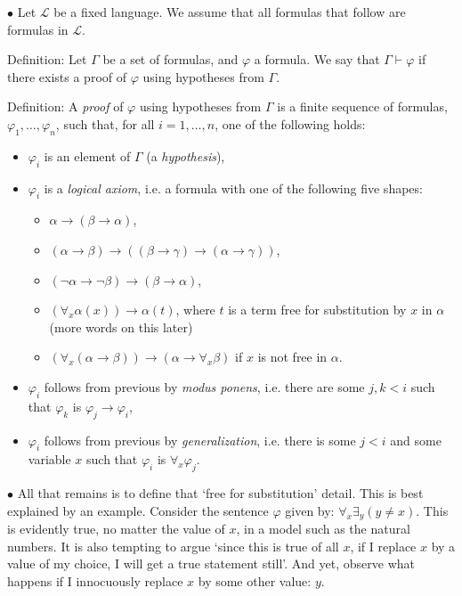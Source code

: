 \documentclass{article}
\newcommand{\Lang}{\mathcal{L}}
\newcommand\point[1]{\noindent \hspace{\labelsep} $\bullet$ #1 \smallskip}
\begin{document}
\point{Let $\Lang$ be a fixed language. We assume that all formulas that follow are formulas in $\Lang$.

Definition: Let $\Gamma$ be a set of formulas, and $\varphi$ a formula. We say that $\Gamma \vdash \varphi$ if there exists a proof of $\varphi$ using hypotheses from $\Gamma$.

Definition: A \emph{proof} of $\varphi$ using hypotheses from $\Gamma$ is a finite sequence of formulas, $\varphi_1, \dots, \varphi_n$, such that, for all $i = 1, \dots, n$, one of the following holds:
\begin{itemize}
\item $\varphi_i$ is an element of $\Gamma$ (a \emph{hypothesis}),
\item $\varphi_i$ is a \emph{logical axiom}, i.e. a formula with one of the following five shapes:
\begin{itemize}
\item $\alpha \rightarrow (\beta \rightarrow \alpha)$,
\item $(\alpha \rightarrow \beta) \rightarrow ( (\beta \rightarrow \gamma) \rightarrow (\alpha \rightarrow \gamma))$,
\item $(\neg \alpha \rightarrow \neg \beta) \rightarrow (\beta \rightarrow \alpha)$,
\item $(\forall_x \alpha(x)) \rightarrow \alpha(t)$, where $t$ is a term free for substitution by $x$ in $\alpha$ (more words on this later)
\item $(\forall_x (\alpha \rightarrow \beta)) \rightarrow (\alpha \rightarrow \forall_x \beta)$ if $x$ is not free in $\alpha$.
\end{itemize}
\item $\varphi_i$ follows from previous by \emph{modus ponens}, i.e. there are some $j, k < i$ such that $\varphi_k$ is $\varphi_j \rightarrow \varphi_i$,
\item $\varphi_i$ follows from previous by \emph{generalization}, i.e. there is some $j < i$ and some variable $x$ such that $\varphi_i$ is $\forall_x \varphi_j$.
\end{itemize}}

\point{All that remains is to define that `free for substitution' detail. This is best explained by an example. Consider the sentence $\varphi$ given by: $\forall_x \exists_y (y \neq x)$. This is evidently true, no matter the value of $x$, in a model such as the natural numbers. It is also tempting to argue `since this is true of all $x$, if I replace $x$ by a value of my choice, I will get a true statement still'. And yet, observe what happens if I innocuously replace $x$ by some other value: $y$.}
\end{document}
